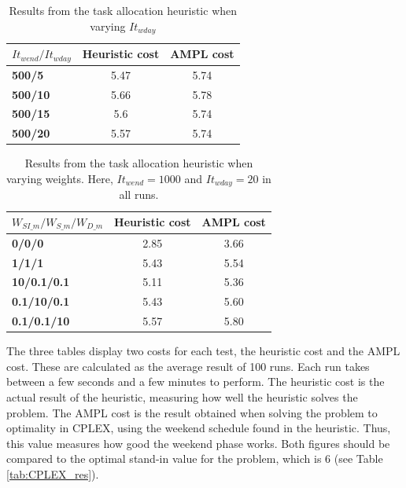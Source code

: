 \begin{table}[!h]
\centering
\caption{Results from the task allocation heuristic when varying $It_{wday}$}
\label{tab:taskdist_res_wdayit}
\begin{tabular}{|l|l|l|}
\hline
\rowcolor{Gray} \textbf{$It_{wend}/It_{wday}$} &  \textbf{Heuristic cost} &  \textbf{AMPL cost} \\ \hline
\cellcolor{Gray} \textbf{500/5} & \multicolumn{1}{c|}{5.47} & \multicolumn{1}{c|}{5.74} \\
\cellcolor{Gray} \textbf{500/10} & \multicolumn{1}{c|}{5.66} & \multicolumn{1}{c|}{5.78} \\
\cellcolor{Gray} \textbf{500/15} & \multicolumn{1}{c|}{5.6} & \multicolumn{1}{c|}{5.74} \\
\cellcolor{Gray} \textbf{500/20} & \multicolumn{1}{c|}{5.57} & \multicolumn{1}{c|}{5.74} \\
\hline
\end{tabular}
\end{table}


\begin{table}[!h]
\centering
\caption{Results from the task allocation heuristic when varying weights. Here, $It_{wend} = 1000$ and $It_{wday} = 20$ in all runs.}
\label{tab:taskdist_weights_res}
\begin{tabular}{|l|l|l|}
\hline
\rowcolor{Gray} \textbf{$W_{SI\_m}/W_{S\_m}/W_{D\_m}$} & \textbf{Heuristic cost} &  \textbf{AMPL cost} \\ \hline
\cellcolor{Gray} \textbf{0/0/0 }& \multicolumn{1}{c|}{2.85} & \multicolumn{1}{c|}{3.66}  \\
\cellcolor{Gray} \textbf{1/1/1} & \multicolumn{1}{c|}{5.43} & \multicolumn{1}{c|}{5.54}  \\
\cellcolor{Gray} \textbf{10/0.1/0.1} & \multicolumn{1}{c|}{5.11} & \multicolumn{1}{c|}{5.36}  \\
\cellcolor{Gray} \textbf{0.1/10/0.1} & \multicolumn{1}{c|}{5.43} & \multicolumn{1}{c|}{5.60}  \\
\cellcolor{Gray} \textbf{0.1/0.1/10} & \multicolumn{1}{c|}{5.57} & \multicolumn{1}{c|}{5.80} \\
\hline
\end{tabular}
\end{table}

The three tables display two costs for each test, the heuristic cost and the AMPL cost. These are calculated as the average result of 100 runs. Each run takes between a few seconds and a few minutes to perform. The heuristic cost is the actual result of the heuristic, measuring how well the heuristic solves the problem. The AMPL cost is the result obtained when solving the problem to optimality in CPLEX, using the weekend schedule found in the heuristic. Thus, this value measures how good the weekend phase works. Both figures should be compared to the optimal stand-in value for the problem, which is 6 (see Table \ref{tab:CPLEX_res}).


